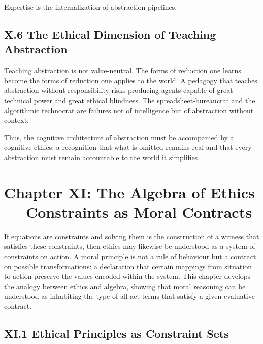 \documentclass[12pt,letterpaper]{article}
\begin{document}
Expertise is the internalization of abstraction pipelines.

\subsection{X.6 The Ethical Dimension of Teaching Abstraction}

Teaching abstraction is not value-neutral. The forms of reduction one learns become the forms of reduction one applies to the world. A pedagogy that teaches abstraction without responsibility risks producing agents capable of great technical power and great ethical blindness. The spreadsheet-bureaucrat and the algorithmic technocrat are failures not of intelligence but of abstraction without context.

Thus, the cognitive architecture of abstraction must be accompanied by a cognitive ethics: a recognition that what is omitted remains real and that every abstraction must remain accountable to the world it simplifies.

\newpage
\section{Chapter XI: The Algebra of Ethics — Constraints as Moral Contracts}

If equations are constraints and solving them is the construction of a witness that satisfies these constraints, then ethics may likewise be understood as a system of constraints on action. A moral principle is not a rule of behaviour but a contract on possible transformations: a declaration that certain mappings from situation to action preserve the values encoded within the system. This chapter develops the analogy between ethics and algebra, showing that moral reasoning can be understood as inhabiting the type of all act-terms that satisfy a given evaluative contract.

\subsection{XI.1 Ethical Principles as Constraint Sets}
\end{document}
